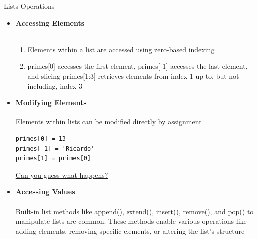 \documentclass[
	11pt, 
]{beamer}
\begin{document}
\begin{frame}[fragile]{Lists Operations}
\scriptsize
\begin{itemize}
    \item \textbf{Accessing Elements} \\ \\ \smallskip
    \begin{enumerate}
        \item  Elements within a list are accessed using zero-based indexing \\
    
        \item  primes[0] accesses the first element, primes[-1] accesses the last element, and slicing primes[1:3] retrieves elements from index 1 up to, but not including, index 3

    \end{enumerate}
    \smallskip
    
    \item \textbf{Modifying Elements} \\ \\ \smallskip
    Elements within lists can be modified directly by assignment

    \begin{verbatim} 
primes[0] = 13  
primes[-1] = 'Ricardo'
primes[1] = primes[0]
    \end{verbatim}
     \underline{Can you guess what happens?} \smallskip

    \item \textbf{Accessing Values} \\ \\ \smallskip
     Built-in list methods like append(), extend(), insert(), remove(), and pop() to manipulate lists are common. These methods enable various operations like adding elements, removing specific elements, or altering the list's structure

\end{itemize}
\end{frame}

\end{document}
